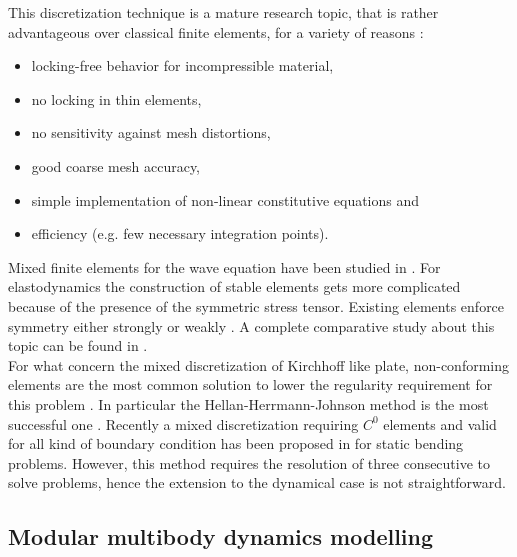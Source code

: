 This discretization technique is a mature research topic, that is rather advantageous over classical finite elements, for a variety of reasons \cite{wriggers2009}:
\begin{itemize}
	\item locking-free behavior for incompressible material,
	\item no locking in thin elements,
	\item no sensitivity against mesh distortions,
	\item good coarse mesh accuracy, 
	\item simple implementation of non-linear constitutive equations and
	\item efficiency (e.g. few necessary integration points).
\end{itemize}

Mixed finite elements for the wave equation have been studied in \cite{geveci1988,becache2000wave}. For elastodynamics the construction of stable elements gets more complicated because of the presence of the symmetric stress tensor. Existing elements enforce symmetry either strongly \cite{becache2001elas,arnold2002mixed} or weakly \cite{arnold2007mixed,arnold2014elastodynamics}. A complete comparative study about this topic can be found in \cite{lee2012mixed}. \\

For what concern the mixed discretization of Kirchhoff like plate, non-conforming elements are the most common solution to lower the regularity requirement for this problem \cite{arnold1990intro}. In particular the Hellan-Herrmann-Johnson method \cite{hellan1967,herrmann1967finite,johnson1973convergence} is the most successful one \cite{blum1990,arnold2019hellan}. Recently a mixed discretization requiring $C^0$ elements and valid for all kind of boundary condition has been proposed in \cite{rafetseder2018siam} for static bending problems. However, this method requires the resolution of three consecutive to solve problems, hence the extension to the dynamical case is not straightforward. 

 
\subsection{Modular multibody dynamics modelling}


